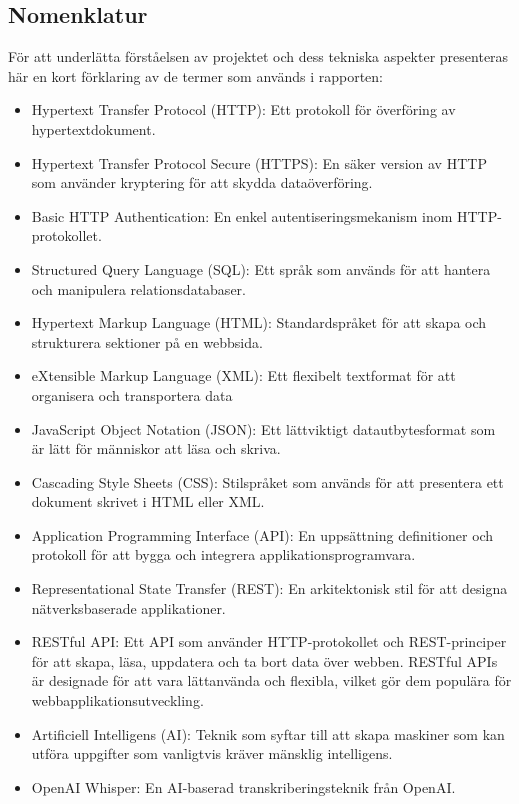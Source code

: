 \subsection{Nomenklatur}
För att underlätta förståelsen av projektet och dess tekniska aspekter
presenteras här en kort förklaring av de termer som används i rapporten:
\begin{itemize}
    \item Hypertext Transfer Protocol (HTTP): Ett protokoll för överföring av
    hypertextdokument.
    \item Hypertext Transfer Protocol Secure (HTTPS): En säker version av HTTP
    som använder kryptering för att skydda dataöverföring.
    \item Basic HTTP Authentication: En enkel autentiseringsmekanism inom
    HTTP-protokollet.
    \item Structured Query Language (SQL): Ett språk som används för att
    hantera och manipulera relationsdatabaser.
    \item Hypertext Markup Language (HTML): Standardspråket för att skapa och
    strukturera sektioner på en webbsida.
    \item eXtensible Markup Language (XML): Ett flexibelt textformat för att
    organisera och transportera data
    \item JavaScript Object Notation (JSON): Ett lättviktigt datautbytesformat
    som är lätt för människor att läsa och skriva.
    \item Cascading Style Sheets (CSS): Stilspråket som används för att
    presentera ett dokument skrivet i HTML eller XML.
    \item Application Programming Interface (API): En uppsättning definitioner
    och protokoll för att bygga och integrera applikationsprogramvara.
    \item Representational State Transfer (REST): En arkitektonisk stil för
    att designa nätverksbaserade applikationer.
    \item RESTful API: Ett API som använder HTTP-protokollet och REST-principer
    för att skapa, läsa, uppdatera och ta bort data över webben. RESTful APIs
    är designade för att vara lättanvända och flexibla, vilket gör dem populära
    för webbapplikationsutveckling.
    \item Artificiell Intelligens (AI): Teknik som syftar till att skapa
    maskiner som kan utföra uppgifter som vanligtvis kräver mänsklig
    intelligens.
    \item OpenAI Whisper: En AI-baserad transkriberingsteknik från
    OpenAI.
\end{itemize}

